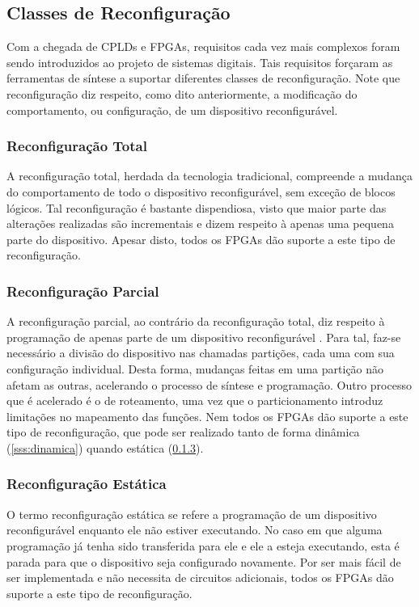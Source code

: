 \documentclass[11pt,a4paper,oneside]{book}
\begin{document}
\subsection{Classes de Reconfigura\c{c}\~ao}
Com a chegada de CPLDs e FPGAs, requisitos cada vez mais complexos foram sendo introduzidos ao projeto de sistemas digitais.
Tais requisitos for\c{c}aram as ferramentas de s\'i­ntese a suportar diferentes classes de reconfigura\c{c}\~ao.
Note que reconfigura\c{c}\~ao diz respeito, como dito anteriormente, a modifica\c{c}\~ao do comportamento, ou configura\c{c}\~ao, de um dispositivo reconfigur\'avel.

\subsubsection{Reconfigura\c{c}\~ao Total}
A reconfigura\c{c}\~ao total, herdada da tecnologia tradicional, compreende a mudan\c{c}a do comportamento de todo o dispositivo reconfigur\'avel, sem exce\c{c}\~ao de blocos l\'ogicos.
Tal reconfigura\c{c}\~ao \'e bastante dispendiosa, visto que maior parte das alterações realizadas são incrementais e dizem respeito \`a apenas uma pequena parte do dispositivo.
Apesar disto, todos os FPGAs d\~ao suporte a este tipo de reconfigura\c{c}\~ao.

\subsubsection{Reconfigura\c{c}\~ao Parcial}
A reconfigura\c{c}\~ao parcial, ao contr\'ario da reconfigura\c{c}\~ao total, diz respeito \`a programa\c{c}\~ao de apenas parte de um dispositivo reconfigur\'avel \cite{Hauck2007}.
Para tal, faz-se necess\'ario a divis\~ao do dispositivo nas chamadas parti\c{c}\~oes, cada uma com sua configura\c{c}\~ao individual.
Desta forma, mudan\c{c}as feitas em uma parti\c{c}\~ao n\~ao afetam as outras, acelerando o processo de s\'i­ntese e programa\c{c}\~ao.
Outro processo que \'e acelerado \'e o de roteamento, uma vez que o particionamento introduz limita\c{c}\~oes no mapeamento das fun\c{c}\~oes.
Nem todos os FPGAs d\~ao suporte a este tipo de reconfigura\c{c}\~ao, que pode ser realizado tanto de forma dinâmica (\ref{sss:dinamica}) quando estática (\ref{sss:estatica}).

\subsubsection{Reconfigura\c{c}\~ao Est\'atica}
\label{sss:estatica}
O termo reconfigura\c{c}\~ao est\'atica se refere a programa\c{c}\~ao de um dispositivo reconfigur\'avel enquanto ele n\~ao estiver executando.
No caso em que alguma programa\c{c}\~ao j\'a tenha sido transferida para ele e ele a esteja executando, esta \'e parada para que o dispositivo seja configurado novamente.
Por ser mais f\'acil de ser implementada e n\~ao necessita de circuitos adicionais, todos os FPGAs d\~ao suporte a este tipo de reconfigura\c{c}\~ao.
\end{document}
